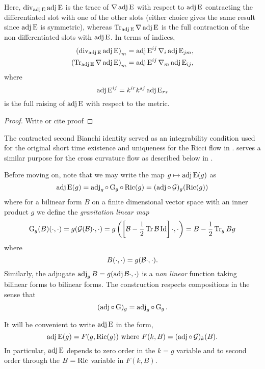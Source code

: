 \documentclass[a4paper, 12pt]{amsart}
\begin{document}
Here, \(\operatorname{div}_{\operatorname{adj}\operatorname{E}} \operatorname{adj}\operatorname{E}\) is the trace of \(\nabla \operatorname{adj}\operatorname{E}\) with respect to \(\operatorname{adj}\operatorname{E}\) contracting the differentiated slot with one of the other slots (either choice gives the same result since \(\operatorname{adj}\operatorname{E}\) is symmetric), whereas \(\operatorname{Tr}_{\operatorname{adj}\operatorname{E}} \nabla\operatorname{adj}\operatorname{E}\) is the full contraction of the non differentiated slots with \(\operatorname{adj}\operatorname{E}\). In terms of indices,
\[
\begin{split}
\left(\operatorname{div}_{\operatorname{adj}\operatorname{E}} \operatorname{adj}\operatorname{E}\right)_m &= \operatorname{adj}\operatorname{E}^{ij} \nabla_i \operatorname{adj}\operatorname{E}_{jm}, \\
\left(\operatorname{Tr}_{\operatorname{adj}\operatorname{E}} \nabla \operatorname{adj}\operatorname{E}\right)_m &= \operatorname{adj}\operatorname{E}^{ij} \nabla_m \operatorname{adj}\operatorname{E}_{ij},
\end{split}
\]
where
\[
\operatorname{adj}\operatorname{E}^{ij} = k^{ir}k^{sj} \operatorname{adj}\operatorname{E}_{rs}
\]
is the full raising of \(\operatorname{adj}\operatorname{E}\) with respect to the metric.

\begin{proof}
{\color{red}Write or cite proof}
\end{proof}

The contracted second Bianchi identity served as an integrability condition used for the original short time existence and uniqueness for the Ricci flow in \cite{Hamilton:/1982}.  serves a similar purpose for the cross curvature flow as described below in .

Before moving on, note that we may write the map \(g \mapsto \operatorname{adj}\operatorname{E}(g)\) as
\[
\operatorname{adj}\operatorname{E}(g) = \operatorname{adj}_g \circ \operatorname{G}_g \circ \operatorname{Ric} (g) = (\operatorname{adj} \circ \operatorname{\mathcal{G}})_g (\operatorname{Ric}(g))
\]
where for a bilinear form \(B\) on a finite dimensional vector space with an inner product \(g\) we define the \emph{gravitation linear map}
\[
\operatorname{G}_g(B) (\cdot, \cdot) = g(\operatorname{\mathcal{G}}(\mathcal{B}) \cdot, \cdot) = g\left(\left[\mathcal{B} - \frac{1}{2} \operatorname{Tr}\mathcal{B} \operatorname{Id}\right] \cdot, \cdot\right) = B - \frac{1}{2} \operatorname{Tr}_g B g
\]
where
\[
B(\cdot, \cdot) = g(\mathcal{B} \cdot, \cdot).
\]
Similarly, the adjugate \(\operatorname{adj}_g B = g(\operatorname{adj}\mathcal{B} \cdot, \cdot)\) is a \emph{non linear} function taking bilinear forms to bilinear forms. The construction respects compositions in the sense that
\[
(\operatorname{adj} \circ \operatorname{G})_g = \operatorname{adj}_g \circ \operatorname{G}_g.
\]

It will be convenient to write \(\operatorname{adj}\operatorname{E}\) in the form,
\begin{equation}
\label{eq:adjein_op}
\operatorname{adj}\operatorname{E} (g) = F(g, \operatorname{Ric}(g)) \text{ where } F(k, B) = (\operatorname{adj} \circ \operatorname{\mathcal{G}})_k (B).
\end{equation}
In particular, \(\operatorname{adj}\operatorname{E}\) depends to zero order in the \(k=g\) variable and to second order through the \(B = \operatorname{Ric}\) variable in \(F(k, B)\).
\end{document}
